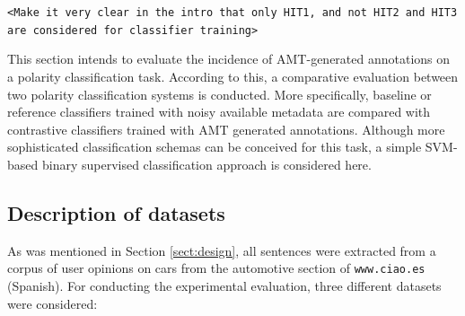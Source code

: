 \documentclass[11pt,letterpaper]{article}
\begin{document}
\texttt{<Make it very clear in the intro that only HIT1, and not HIT2 and HIT3 are considered for classifier training>}

This section intends to evaluate the incidence of AMT-generated annotations on a polarity classification task.
According to this, a comparative evaluation between two polarity classification systems is conducted. 
More specifically, baseline or reference classifiers trained with noisy available metadata are compared with 
contrastive classifiers trained with AMT generated annotations.  
Although more sophisticated classification schemas can be conceived for this task, a simple SVM-based binary supervised classification approach is considered here.

\subsection{Description of datasets}

As was mentioned in Section \ref{sect:design}, all sentences were extracted from a corpus of user opinions on cars from the automotive section of \texttt{www.ciao.es} (Spanish). For conducting the experimental evaluation, three different datasets were considered:
\end{document}
